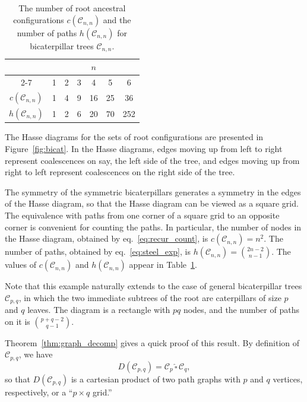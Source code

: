 \documentclass[10pt]{article}
\newcommand{\house}{\,\widehat{\square}\,}
\newcommand*{\cphat}[2]{#1 \house #2}
\begin{document}
\begin{table}[tb]
\centering
	\begin{tabular}{ccccccc}
		\toprule 
            & \multicolumn{6}{c}{$n$} \\ \cline{2-7}
		    & 1 & 2 & 3 & 4 & 5 & 6 \\
		\hline
		$c(\mathcal C_{n,n})$ & 1 & 4 & 9 & 16 & 25 & 36 \\
		$h(\mathcal C_{n,n})$ & 1 & 2 & 6 & 20 & 70 & 252 \\
		\bottomrule
	\end{tabular}
	\caption{The number of root ancestral configurations $c(\mathcal C_{n,n})$ and the number of paths $h(\mathcal C_{n,n})$ for bicaterpillar trees $\mathcal C_{n,n}$.}
	\label{tbl:bicat_numbers}
\end{table}

The Hasse diagrams for the sets of root configurations are presented in Figure~\ref{fig:bicat}. In the Hasse diagrams, edges moving up from left to right represent coalescences on say, the left side of the tree, and edges moving up from right to left represent coalescences on the right side of the tree.

The symmetry of the symmetric bicaterpillars generates a symmetry in the edges of the Hasse diagram, so that the Hasse diagram can be viewed as a square grid. The equivalence with paths from one corner of a square grid to an opposite corner is convenient for counting the paths. In particular, the number of nodes in the Hasse diagram, obtained by eq.~\ref{eq:recur_count}, is $c(\mathcal{C}_{n,n}) = n^2$. The number of paths, obtained by eq.~\ref{eq:steel_exp}, is $h(\mathcal{C}_{n,n})={2n-2 \choose n-1}$. The values of $c(\mathcal{C}_{n,n})$ and $h(\mathcal{C}_{n,n})$ appear in Table~\ref{tbl:bicat_numbers}.

Note that this example naturally extends to the case of general bicaterpillar trees $\mathcal C_{p,q}$, in which the two immediate subtrees of the root are caterpillars of size $p$ and $q$ leaves. The diagram is a rectangle with $pq$ nodes, and the number of paths on it is $\binom{p+q-2}{q-1}$.

Theorem~\ref{thm:graph_decomp} gives a quick proof of this result. By definition of $\mathcal C_{p,q}$, we have 
\begin{equation}\label{eq:decomp_bicat}
    D(\mathcal C_{p,q}) = \cphat{\mathcal C_p}{\mathcal C_q},
\end{equation}
so that $D(\mathcal C_{p,q})$ is a cartesian product of two path graphs with $p$ and $q$ vertices, respectively, or a ``$p \times q$ grid.'' 
\end{document}
